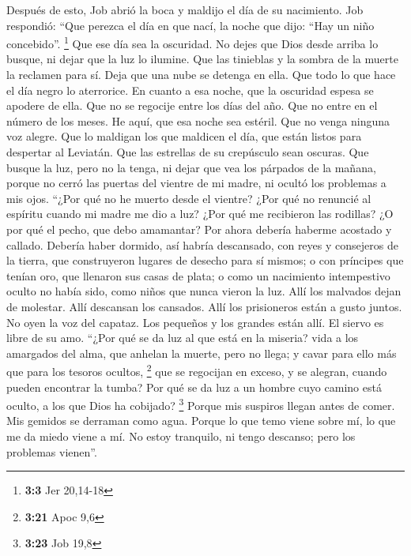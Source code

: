 \begin{paracol}{2}
 Después de esto, Job abrió la boca y maldijo el día de su
nacimiento.  Job respondió:  ``Que perezca
el día en que nací, la noche que dijo: ``Hay un niño concebido''.
\footnote{\textbf{3:3} Jer 20,14-18}  Que ese día sea la
oscuridad. No dejes que Dios desde arriba lo busque, ni dejar que la luz
lo ilumine.  Que las tinieblas y la sombra de la muerte la
reclamen para sí. Deja que una nube se detenga en ella. Que todo lo que
hace el día negro lo aterrorice.  En cuanto a esa noche,
que la oscuridad espesa se apodere de ella. Que no se regocije entre los
días del año. Que no entre en el número de los meses.  He
aquí, que esa noche sea estéril. Que no venga ninguna voz alegre.
 Que lo maldigan los que maldicen el día, que están listos
para despertar al Leviatán.  Que las estrellas de su
crepúsculo sean oscuras. Que busque la luz, pero no la tenga, ni dejar
que vea los párpados de la mañana,  porque no cerró las
puertas del vientre de mi madre, ni ocultó los problemas a mis ojos.
 ``¿Por qué no he muerto desde el vientre? ¿Por qué no
renuncié al espíritu cuando mi madre me dio a luz?  ¿Por
qué me recibieron las rodillas? ¿O por qué el pecho, que debo amamantar?
 Por ahora debería haberme acostado y callado. Debería
haber dormido, así habría descansado,  con reyes y
consejeros de la tierra, que construyeron lugares de desecho para sí
mismos;  o con príncipes que tenían oro, que llenaron sus
casas de plata;  o como un nacimiento intempestivo oculto
no había sido, como niños que nunca vieron la luz.  Allí
los malvados dejan de molestar. Allí descansan los cansados.
 Allí los prisioneros están a gusto juntos. No oyen la
voz del capataz.  Los pequeños y los grandes están allí.
El siervo es libre de su amo.  ``¿Por qué se da luz al
que está en la miseria? vida a los amargados del alma, 
que anhelan la muerte, pero no llega; y cavar para ello más que para los
tesoros ocultos, \footnote{\textbf{3:21} Apoc 9,6}  que
se regocijan en exceso, y se alegran, cuando pueden encontrar la tumba?
 Por qué se da luz a un hombre cuyo camino está oculto, a
los que Dios ha cobijado? \footnote{\textbf{3:23} Job 19,8}
 Porque mis suspiros llegan antes de comer. Mis gemidos
se derraman como agua.  Porque lo que temo viene sobre
mí, lo que me da miedo viene a mí.  No estoy tranquilo,
ni tengo descanso; pero los problemas vienen''.


\end{paracol}
